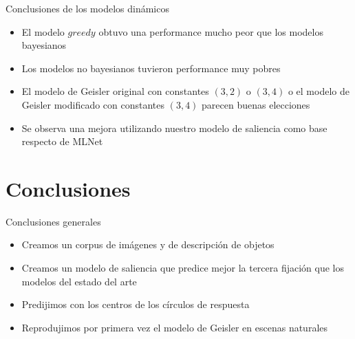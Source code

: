 \documentclass[compress]{beamer}
\begin{document}

\begin{frame}{Conclusiones de los modelos dinámicos}
\begin{itemize}
\item El modelo $greedy$ obtuvo una performance mucho peor que los modelos bayesianos
\item Los modelos no bayesianos tuvieron performance muy pobres
\item El modelo de Geisler original con constantes $(3,2)$ o $(3,4)$ o el modelo de Geisler modificado con constantes $(3,4)$ parecen buenas elecciones
\item Se observa una mejora utilizando nuestro modelo de saliencia como base respecto de MLNet
\end{itemize}
\end{frame}

\section{Conclusiones}
\begin{frame}{Conclusiones generales}
\begin{itemize}
\item Creamos un corpus de imágenes y de descripción de objetos
\item Creamos un modelo de saliencia que predice mejor la tercera fijación que los modelos del estado del arte
\item Predijimos con los centros de los círculos de respuesta
\item Reprodujimos por primera vez el modelo de Geisler en escenas naturales
\end{itemize}
\end{frame}
\end{document}
